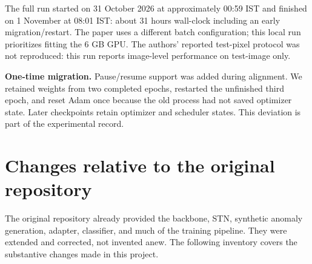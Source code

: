\documentclass[11pt,a4paper]{article}
\begin{document}
The full run started on 31 October 2026 at approximately 00:59 IST and finished on 1 November at 08:01 IST: about 31 hours wall-clock including an early migration/restart. The paper uses a different batch configuration; this local run prioritizes fitting the 6 GB GPU. The authors' reported test-pixel protocol was not reproduced: this run reports image-level performance on test-image only.

\textbf{One-time migration.} Pause/resume support was added during alignment. We retained weights from two completed epochs, restarted the unfinished third epoch, and reset Adam once because the old process had not saved optimizer state. Later checkpoints retain optimizer and scheduler states. This deviation is part of the experimental record.

\section{Changes relative to the original repository}
The original repository already provided the backbone, STN, synthetic anomaly generation, adapter, classifier, and much of the training pipeline. They were extended and corrected, not invented anew. The following inventory covers the substantive changes made in this project.
\end{document}
